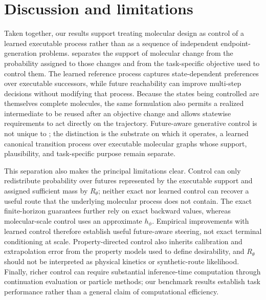 \section{Discussion and limitations}
\label{sec:discussion}

Taken together, our results support treating molecular design as control of a learned executable process rather than as a sequence of independent endpoint-generation problems. \method{} separates the support of molecular change from the probability assigned to those changes and from the task-specific objective used to control them. The learned reference process captures state-dependent preferences over executable successors, while future reachability can improve multi-step decisions without modifying that process. Because the states being controlled are themselves complete molecules, the same formulation also permits a realized intermediate to be reused after an objective change and allows statewise requirements to act directly on the trajectory. Future-aware generative control is not unique to \method{}; the distinction is the substrate on which it operates, a learned canonical transition process over executable molecular graphs whose support, plausibility, and task-specific purpose remain separate.

This separation also makes the principal limitations clear. Control can only redistribute probability over futures represented by the executable support and assigned sufficient mass by $R_\theta$; neither exact nor learned control can recover a useful route that the underlying molecular process does not contain. The exact finite-horizon guarantees further rely on exact backward values, whereas molecular-scale control uses an approximate $h_\phi$. Empirical improvements with learned control therefore establish useful future-aware steering, not exact terminal conditioning at scale. Property-directed control also inherits calibration and extrapolation error from the property models used to define desirability, and $R_\theta$ should not be interpreted as physical kinetics or synthetic-route likelihood. Finally, richer control can require substantial inference-time computation through continuation evaluation or particle methods; our benchmark results establish task performance rather than a general claim of computational efficiency.

